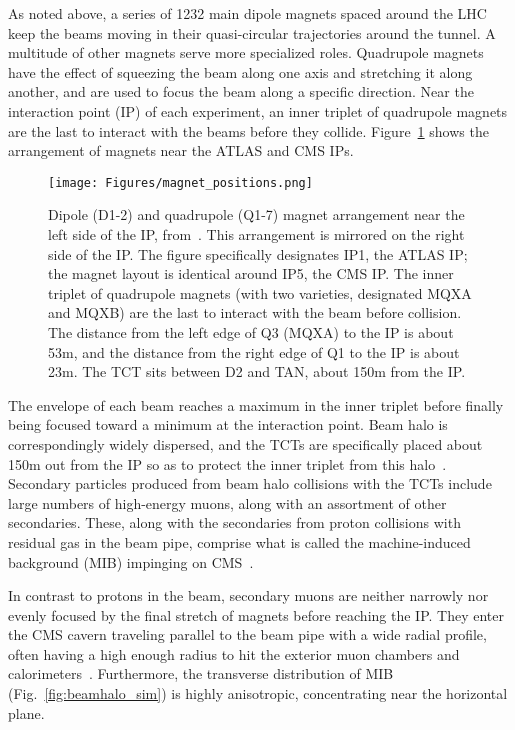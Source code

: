 As noted above, a series of 1232 main dipole magnets spaced around the LHC keep the beams moving
in their quasi-circular trajectories around the tunnel. A multitude of other magnets serve more specialized roles. Quadrupole
magnets have the effect of squeezing the beam along one axis and stretching it along another, and are used to focus
the beam along a specific direction. Near the interaction point (IP) of each experiment, an inner triplet of quadrupole magnets
are the last to interact with the beams before they collide. Figure~\ref{fig:magnet_positions} shows the arrangement
of magnets near the ATLAS and CMS IPs.

\begin{figure}[hbtp]
  \begin{center}
    \texttt{[image: Figures/magnet\_positions.png]}
    \caption{
    Dipole (D1-2) and quadrupole (Q1-7) magnet arrangement near the left side of the IP, from~\cite{ref:PAC.2003.1289077}.
    This arrangement is mirrored on the right side of the IP.
    The figure specifically designates IP1, the ATLAS IP; the magnet layout is identical around IP5, the CMS IP.
    The inner triplet of quadrupole magnets (with two varieties, designated MQXA and MQXB)
    are the last to interact with the beam before collision.
    The distance from the left edge of Q3 (MQXA) to the IP is about 53\unit{m},
    and the distance from the right edge of Q1 to the IP is about 23\unit{m}.
    The TCT sits between D2 and TAN, about 150\unit{m} from the IP.
    }
    \label{fig:magnet_positions}
  \end{center}
\end{figure}

The envelope of each beam reaches a maximum in the inner triplet
before finally being focused toward a minimum at the interaction point. Beam halo is correspondingly widely dispersed,
and the TCTs are specifically placed about 150\unit{m} out from the IP so as to protect the inner triplet from this halo~\cite{ref:PhysRevSTAB.18.061001}.
Secondary particles produced from beam
halo collisions with the TCTs include large numbers of high-energy muons, along with an assortment of other secondaries.
These, along with the secondaries from proton collisions with residual gas in the beam pipe, comprise
what is called the machine-induced background (MIB) impinging on CMS~\cite{ref:1748-0221/10/11/P11011}.

In contrast to protons in the beam, secondary muons are neither narrowly nor evenly focused by the final stretch of magnets before reaching the IP.
They enter the CMS cavern traveling parallel to the beam pipe with a wide radial profile, often having a high enough
radius to hit the exterior muon chambers and calorimeters~\cite{ref:1748-0221/10/11/P11011}.
Furthermore, the transverse distribution of MIB (Fig.~\ref{fig:beamhalo_sim}) is highly anisotropic, concentrating near the
horizontal plane.

